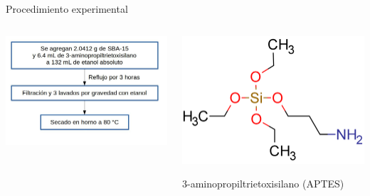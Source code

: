 \documentclass[handout]{beamer}
\begin{document}
\begin{frame}{Procedimiento experimental}
	\begin{columns}
		\begin{column}{0.5\textwidth}
			\includegraphics[width=\linewidth]{experimental2.jpg}
		\end{column}
		\begin{column}{0.5\textwidth}
			\includegraphics[width=0.5\linewidth]{../structures/aminosilicate.png}
			
			3-aminopropiltrietoxisilano (APTES)
		\end{column}
	\end{columns}
\end{frame}
\end{document}
